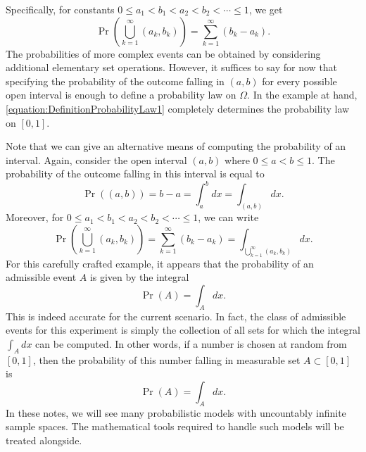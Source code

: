Specifically, for constants $0 \leq a_1 < b_1 < a_2 < b_2 < \cdots \leq 1$, we get
\begin{equation*}
\Pr \left( \bigcup_{k=1}^{\infty} (a_k,b_k) \right)
= \sum_{k=1}^{\infty} \left( b_k - a_k \right) .
\end{equation*}
The probabilities of more complex events can be obtained by considering additional elementary set operations.
However, it suffices to say for now that specifying the probability of the outcome falling in $(a,b)$ for every possible open interval is enough to define a probability law on $\Omega$.
In the example at hand, \eqref{equation:DefinitionProbabilityLaw1} completely determines the probability law on $[0,1]$.

Note that we can give an alternative means of computing the probability of an interval.
Again, consider the open interval $(a, b)$ where $0 \leq a < b \leq 1$.
The probability of the outcome falling in this  interval is equal to
\begin{equation*}
\Pr ( (a, b) ) = b - a = \int_a^b dx = \int_{(a,b)} dx .
\end{equation*}
Moreover, for $0 \leq a_1 < b_1 < a_2 < b_2 < \cdots \leq 1$, we can write
\begin{equation*}
\Pr \left( \bigcup_{k=1}^{\infty} (a_k,b_k) \right)
= \sum_{k=1}^{\infty} \left( b_k - a_k \right)
= \int_{\bigcup_{k=1}^{\infty} (a_k,b_k)} dx .
\end{equation*}
For this carefully crafted example, it appears that the probability of an admissible event $A$ is given by the integral
\begin{equation*}
\Pr (A) = \int_{A} dx .
\end{equation*}
This is indeed accurate for the current scenario.
In fact, the class of admissible events for this experiment is simply the collection of all sets for which the integral $\int_A dx$ can be computed.
In other words, if a number is chosen at random from $[0,1]$, then the probability of this number falling in measurable set $A \subset [0,1]$ is
\begin{equation*}
\Pr (A) = \int_{A} dx .
\end{equation*}
In these notes, we will see many probabilistic models with uncountably infinite sample spaces.
The mathematical tools required to handle such models will be treated alongside.

